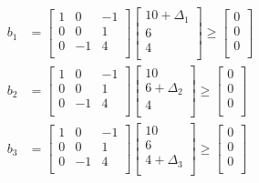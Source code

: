 \begin{solution}
  \begin{align*}
    b_1 &= %
          \begin{bmatrix}
      1& 0& -1\\
      0& 0& 1\\
      0& -1& 4\\
    \end{bmatrix}
    \begin{bmatrix}
      10 + \Delta_1\\
    6\\
    4\\
  \end{bmatrix}\geq
      \begin{bmatrix}
      0\\
    0\\
    0\\
  \end{bmatrix}
    \\
    b_2 & = %
          \begin{bmatrix}
      1& 0& -1\\
      0& 0& 1\\
      0& -1& 4\\
    \end{bmatrix}
    \begin{bmatrix}
      10 \\
    6 + \Delta_2\\
    4\\
  \end{bmatrix}\geq
      \begin{bmatrix}
      0\\
    0\\
    0\\
  \end{bmatrix}
    \\
        b_3 & = %
          \begin{bmatrix}
      1& 0& -1\\
      0& 0& 1\\
      0& -1& 4\\
    \end{bmatrix}
    \begin{bmatrix}
      10 \\
    6 \\
    4 + \Delta_3\\
  \end{bmatrix}\geq
      \begin{bmatrix}
      0\\
    0\\
    0\\
  \end{bmatrix}    
  \end{align*}
  

\end{solution}
